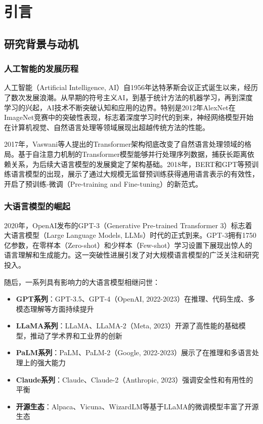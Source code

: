 \section{引言}\label{sec:intro}

\subsection{研究背景与动机}

\subsubsection{人工智能的发展历程}

人工智能（Artificial Intelligence, AI）自1956年达特茅斯会议正式诞生以来，经历了数次发展浪潮。从早期的符号主义AI，到基于统计方法的机器学习，再到深度学习的兴起，AI技术不断突破认知和应用的边界。特别是2012年AlexNet在ImageNet竞赛中的突破性表现，标志着深度学习时代的到来，神经网络模型开始在计算机视觉、自然语言处理等领域展现出超越传统方法的性能。

2017年，Vaswani等人提出的Transformer架构彻底改变了自然语言处理领域的格局。基于自注意力机制的Transformer模型能够并行处理序列数据，捕获长距离依赖关系，为后续大语言模型的发展奠定了架构基础。2018年，BERT和GPT等预训练语言模型的出现，展示了通过大规模无监督预训练获得通用语言表示的有效性，开启了预训练-微调（Pre-training and Fine-tuning）的新范式。

\subsubsection{大语言模型的崛起}

2020年，OpenAI发布的GPT-3（Generative Pre-trained Transformer 3）标志着大语言模型（Large Language Models, LLMs）时代的正式到来。GPT-3拥有1750亿参数，在零样本（Zero-shot）和少样本（Few-shot）学习设置下展现出惊人的语言理解和生成能力。这一突破性进展引发了对大规模语言模型的广泛关注和研究投入。

随后，一系列具有影响力的大语言模型相继问世：

\begin{itemize}[leftmargin=2em]
    \item \textbf{GPT系列}：GPT-3.5、GPT-4（OpenAI, 2022-2023）在推理、代码生成、多模态理解等方面持续提升
    \item \textbf{LLaMA系列}：LLaMA、LLaMA-2（Meta, 2023）开源了高性能的基础模型，推动了学术界和工业界的创新
    \item \textbf{PaLM系列}：PaLM、PaLM-2（Google, 2022-2023）展示了在推理和多语言处理上的强大能力
    \item \textbf{Claude系列}：Claude、Claude-2（Anthropic, 2023）强调安全性和有用性的平衡
    \item \textbf{开源生态}：Alpaca、Vicuna、WizardLM等基于LLaMA的微调模型丰富了开源生态
\end{itemize}

